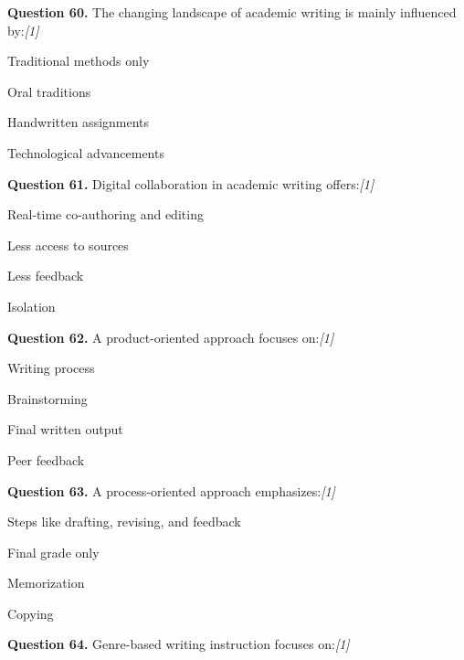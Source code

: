 \documentclass[11pt,a4paper]{article}
\newcommand{\pts}[1]{\hfill   \textit{[#1]}}
\begin{document}
\noindent   \textbf{Question 60.} The changing landscape of academic writing is mainly influenced by:\pts{1}

\begin{parts}
  \item Traditional methods only
  \item Oral traditions
  \item Handwritten assignments
  \item Technological advancements
\end{parts}

\medskip




\noindent   \textbf{Question 61.} Digital collaboration in academic writing offers:\pts{1}

\begin{parts}
  \item Real-time co-authoring and editing
  \item Less access to sources
  \item Less feedback
  \item Isolation
\end{parts}

\medskip




\noindent   \textbf{Question 62.} A product-oriented approach focuses on:\pts{1}

\begin{parts}
  \item Writing process
  \item Brainstorming
  \item Final written output
  \item Peer feedback
\end{parts}

\medskip




\noindent   \textbf{Question 63.} A process-oriented approach emphasizes:\pts{1}

\begin{parts}
  \item Steps like drafting, revising, and feedback
  \item Final grade only
  \item Memorization
  \item Copying
\end{parts}

\medskip




\noindent   \textbf{Question 64.} Genre-based writing instruction focuses on:\pts{1}
\end{document}
